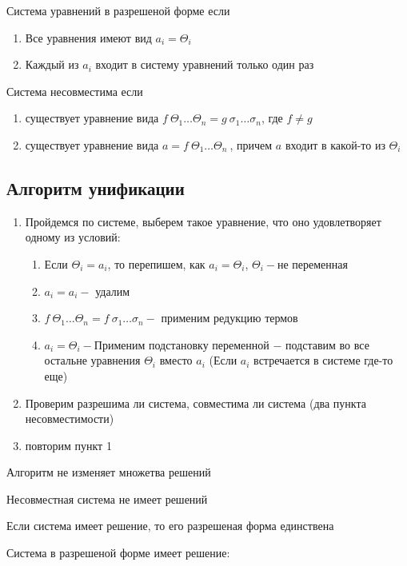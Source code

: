 		\begin{definition}Система уравнений в разрешеной форме если \end{definition}
			\begin{enumerate}
				\item Все уравнения имеют вид $a_i=\Theta_i$
				\item Каждый из $a_i$ входит в систему уравнений только один раз
			\end{enumerate}
		\begin{definition}Система несовместима если\end{definition}
		\begin{enumerate}
			\item существует уравнение вида $f\:\Theta_1\hdots\Theta_n=g\:\sigma_1\hdots\sigma_n$, где $f\neq g$
			\item существует уравнение вида $a=f\:\Theta_1\hdots\Theta_n\:$, причем $a$ входит в какой-то из $\Theta_i$
		\end{enumerate}			

    \subsection{ Алгоритм унификации}
		\begin{enumerate}
		\item Пройдемся по системе, выберем такое уравнение, что оно удовлетворяет одному из условий:\begin{enumerate}
			\item Если $\Theta_i=a_i$, то перепишем, как $a_i=\Theta_i$, $\Theta_i-$не переменная
			\item $a_i=a_i-$ удалим
			\item $f\:\Theta_1\hdots\Theta_n=f\:\sigma_1\hdots\sigma_n-$  применим редукцию термов
			\item $a_i=\Theta_i-$Применим подстановку переменной $-$ подставим во все остальне уравнения $\Theta_i$ вместо $a_i$ (Если $a_i$ встречается в системе где-то еще)
		\end{enumerate}
		\item Проверим разрешима ли система, совместима ли система (два пункта несовместимости)
		\item повторим пункт 1
		\end{enumerate}

		\begin{statement} Алгоритм не изменяет множетва решений\end{statement}
		\begin{statement} Несовместная система не имеет решений\end{statement}
		\begin{statement} Если система имеет решение, то его разрешеная форма единствена\end{statement}
		\begin{statement} Система в разрешеной форме имеет решение:\end{statement}


